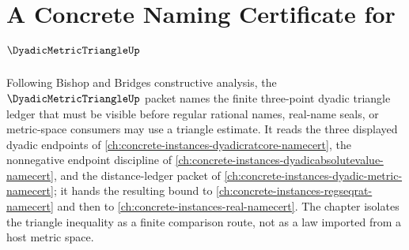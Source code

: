 \chapter{A Concrete Naming Certificate for $\DyadicMetricTriangleUp$}
\label{ch:concrete-instances-dyadic-metric-triangle-namecert}

Following Bishop and Bridges constructive analysis, the $\DyadicMetricTriangleUp$ packet names the finite three-point dyadic triangle ledger that must be visible before regular rational names, real-name seals, or metric-space consumers may use a triangle estimate. It reads the three displayed dyadic endpoints of \autoref{ch:concrete-instances-dyadicratcore-namecert}, the nonnegative endpoint discipline of \autoref{ch:concrete-instances-dyadicabsolutevalue-namecert}, and the distance-ledger packet of \autoref{ch:concrete-instances-dyadic-metric-namecert}; it hands the resulting bound to \autoref{ch:concrete-instances-regseqrat-namecert} and then to \autoref{ch:concrete-instances-real-namecert}. The chapter isolates the triangle inequality as a finite comparison route, not as a law imported from a host metric space.

